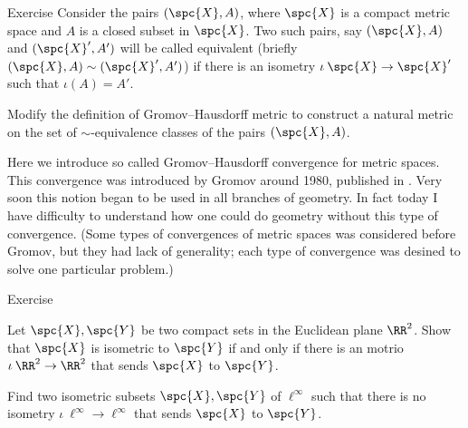 \begin{thm}{Exercise}\label{pr:GH-variation}
Consider the pairs $(\spc{X},A)$, where $\spc{X}$ is a compact metric space and $A$ is a closed subset in $\spc{X}$.
Two such pairs, say $(\spc{X},A)$ and $(\spc{X}',A')$ will be called equivalent (briefly $(\spc{X},A)\sim(\spc{X}',A')$)
if there is an isometry $\iota\:\spc{X}\to \spc{X}'$ such that $\iota(A)=A'$.

Modify the definition of Gromov--Hausdorff metric to construct a natural metric on the set of $\sim$-equivalence classes of the pairs $(\spc{X},A)$.
\end{thm}

Here we introduce so called Gromov--Hausdorff convergence for metric spaces.
This convergence was introduced by Gromov around 1980, published in \cite{gromov-1981}.
Very soon this notion began to be used in all branches of geometry.
In fact today I have difficulty to understand 
how one could do geometry without this type of convergence.%
(Some types of convergences of metric spaces was considered before Gromov,
but they had lack of generality;
each type of convergence was desined to solve one particular problem.)


\begin{thm}{Exercise}\label{ex:euclid-isom}
\begin{subthm}{}
Let $\spc{X},\spc{Y}$ be two compact sets in the Euclidean plane $\RR^2$.
Show that $\spc{X}$ is isometric to $\spc{Y}$ if and only if there is an motrio $\iota\:\RR^2\to \RR^2$
that sends $\spc{X}$ to $\spc{Y}$.
\end{subthm}

\begin{subthm}{}
Find two isometric subsets $\spc{X},\spc{Y}$ of $\ell^\infty$
such that there is no isometry $\iota\:\ell^\infty\to \ell^\infty$ 
that sends $\spc{X}$ to $\spc{Y}$.
\end{subthm}
\end{thm}
